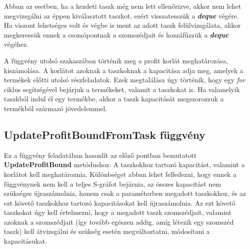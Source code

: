 Abban az esetben, ha a kezdeti taszk még nem lett ellenőrizve, akkor nem lehet megvizsgálni az éppen kiválasztott taszkot, ezért visszatesszük a \textbf{\textit{deque}} végére.
Ha viszont lehetséges volt és végbe is ment az adott taszk felülvizsgálata, akkor megkeressük ennek a csomópontnak a szomszédjait és hozzáfűzzük a \textbf{\textit{deque}} végéhez.

A függvény utolsó szakaszában történik meg a profit korlát meghatározása, kiszámolása.
A korlátot azoknak a taszkoknak a kapacitása adja meg, amelyek a termékek előtti utolsó részfeladatok.
Ezek megtalálása úgy történik, hogy egy \textit{for} ciklus segítségével bejárjuk a termékeket, valamit a taszkokat is.
Ha valamelyik taszkból indul él egy termékbe, akkor a taszk kapacitását megszorozzuk a termékből származó jövedelemmel.

\subsection{UpdateProfitBoundFromTask függvény}
Ez a függvény feladatában hasonlít az előző pontban bemutatott \textbf{UpdateProfitBound} metódushoz.
A taszkokhoz tartozó kapacitást, valamint a korlátot kell meghatároznia.
Különbséget abban lehet felfedezni, hogy ennek a függvénynek nem kell a teljes S-gráfot bejárnia, az összes kapacitást nem szükséges újraszámolnia, hanem csak a paraméterben megadott taszkokhoz, és az ezt követő taszkokhoz tartozó kapacitásokat kell újraszámolnia.
Az ezt követő taszkokat úgy kell értelmezni, hogy a megadott taszk szomszédjait, valamint azoknak a szomszédjait (így tovább egészen addig, amíg létezik egy szomszéd taszk) kell átvizsgálni és szükség esetén megváltoztatni, módosítani a kapacitásukat.

